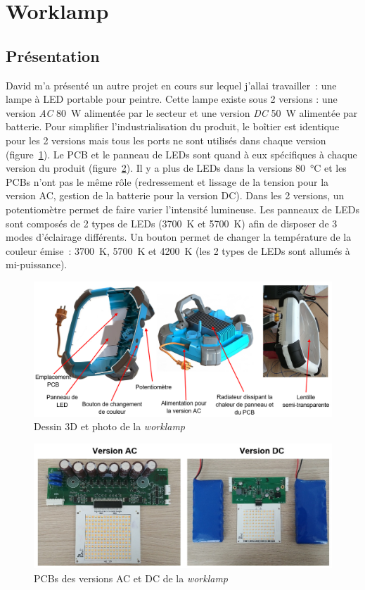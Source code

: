 \documentclass[a4paper, 12pt, sffamily]{report}
\begin{document}
\section{Worklamp}
\subsection{Présentation}
David m’a présenté un autre projet en cours sur lequel j'allai travailler~: une lampe à LED portable pour peintre. Cette lampe existe sous 2 versions : une version \emph{AC} \SI{80}{\watt} alimentée par le secteur et une version \emph{DC} \SI{50}{\watt} alimentée par batterie. Pour simplifier l'industrialisation du produit, le boîtier est identique pour les 2 versions mais tous les ports ne sont utilisés dans chaque version (figure~\ref{fig:captioned_worklamp}). Le PCB et le panneau de LEDs sont quand à eux spécifiques à chaque version du produit (figure~\ref{fig:worklamp_PCBs}). Il y a plus de LEDs dans la versions \SI{80}{\celsius} et les PCBs n'ont pas le même rôle (redressement et lissage de la tension pour la version AC, gestion de la batterie pour la version DC).
Dans les 2 versions, un potentiomètre permet de faire varier l'intensité lumineuse. Les panneaux de LEDs sont composés de 2 types de LEDs (\SI{3700}{\kelvin} et \SI{5700}{\kelvin}) afin de disposer de 3 modes d’éclairage différents. Un bouton permet de changer la température de la couleur émise~: \SI{3700}{\kelvin}, \SI{5700}{\kelvin} et \SI{4200}{\kelvin} (les 2 types de LEDs sont allumés à mi-puissance). 

\begin{figure}[H]
\centering
\includegraphics[scale=0.45]{figures/screenshots/captioned_worklamp.png}
\caption{Dessin 3D et photo de la \emph{worklamp}}
\label{fig:captioned_worklamp}
\end{figure}

\begin{figure}[H]
\centering
\includegraphics[scale=0.43]{figures/photos/worklamp_PCBs.jpg}
\caption{PCBs des versions AC et DC de la \emph{worklamp}}
\label{fig:worklamp_PCBs}
\end{figure}
\end{document}
